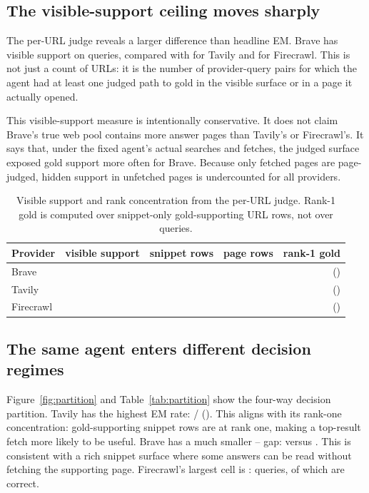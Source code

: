 \subsection{The visible-support ceiling moves sharply}

The per-URL judge reveals a larger difference than headline EM. Brave has visible support on \BraveSupportVisibleQ{} queries, compared with \TavilySupportVisibleQ{} for Tavily and \FirecrawlSupportVisibleQ{} for Firecrawl. This is not just a count of URLs: it is the number of provider-query pairs for which the agent had at least one judged path to gold in the visible surface or in a page it actually opened.

This visible-support measure is intentionally conservative. It does not claim Brave's true web pool contains more answer pages than Tavily's or Firecrawl's. It says that, under the fixed agent's actual searches and fetches, the judged surface exposed gold support more often for Brave. Because only fetched pages are page-judged, hidden support in unfetched pages is undercounted for all providers.

\begin{table}[t]
\centering
\small
\begin{tabular}{lrrrr}
\toprule
\textbf{Provider} & \textbf{visible support} & \textbf{snippet rows} & \textbf{page rows} & \textbf{rank-1 gold} \\
\midrule
Brave & \BraveSupportVisibleQ{} & \BraveSnippetRows{} & \BravePageRows{} & \BraveRankOneGold{} (\BraveRankOnePct{}) \\
Tavily & \TavilySupportVisibleQ{} & \TavilySnippetRows{} & \TavilyPageRows{} & \TavilyRankOneGold{} (\TavilyRankOnePct{}) \\
Firecrawl & \FirecrawlSupportVisibleQ{} & \FirecrawlSnippetRows{} & \FirecrawlPageRows{} & \FirecrawlRankOneGold{} (\FirecrawlRankOnePct{}) \\
\bottomrule
\end{tabular}
\caption{Visible support and rank concentration from the per-URL judge. Rank-1 gold is computed over snippet-only gold-supporting URL rows, not over queries.}
\label{tab:visible-support}
\end{table}

\subsection{The same agent enters different decision regimes}

Figure~\ref{fig:partition} and Table~\ref{tab:partition} show the four-way decision partition. Tavily has the highest \smart{} EM rate: \TavilySmartEM{}/\TavilySmartN{} (\TavilySmartRate{}). This aligns with its rank-one concentration: \TavilyRankOneGold{} gold-supporting snippet rows are at rank one, making a top-result fetch more likely to be useful. Brave has a much smaller \smart{}--\missed{} gap: \BraveSmartRate{} versus \BraveMissedRate{}. This is consistent with a rich snippet surface where some answers can be read without fetching the supporting page. Firecrawl's largest cell is \blind{}: \FirecrawlBlindN{} queries, \FirecrawlBlindEM{} of which are correct.

